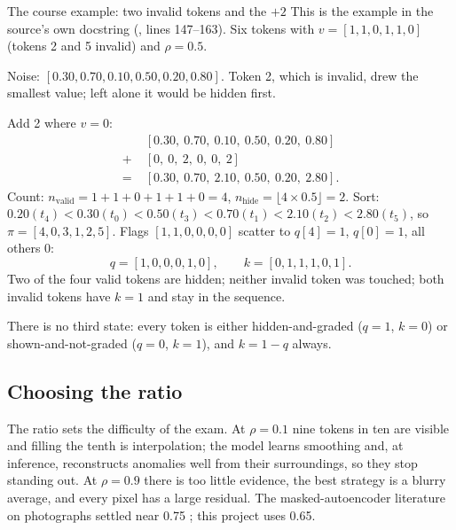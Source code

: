 \begin{worked}[label={we:masking:plus2}]{The course example: two invalid tokens and the \texorpdfstring{$+2$}{+2}}
This is the example in the source's own docstring (, lines 147--163). Six tokens
with $v = [1, 1, 0, 1, 1, 0]$ (tokens 2 and 5 invalid) and $\rho = 0.5$.

Noise: $[0.30, 0.70, 0.10, 0.50, 0.20, 0.80]$. Token 2, which is invalid, drew the smallest value; left
alone it would be hidden first.

Add 2 where $v = 0$:
\begin{align*}
&[0.30,\ 0.70,\ 0.10,\ 0.50,\ 0.20,\ 0.80]\\
+\;&[0,\ 0,\ 2,\ 0,\ 0,\ 2]\\
=\;&[0.30,\ 0.70,\ 2.10,\ 0.50,\ 0.20,\ 2.80] .
\end{align*}
Count: $n_{\text{valid}} = 1+1+0+1+1+0 = 4$, $n_{\text{hide}} = \lfloor 4 \times 0.5 \rfloor = 2$.
Sort: $0.20 (t_4) < 0.30 (t_0) < 0.50 (t_3) < 0.70 (t_1) < 2.10 (t_2) < 2.80 (t_5)$, so
$\pi = [4, 0, 3, 1, 2, 5]$. Flags $[1, 1, 0, 0, 0, 0]$ scatter to $q[4] = 1$, $q[0] = 1$, all others 0:
\[
q = [1, 0, 0, 0, 1, 0], \qquad k = [0, 1, 1, 1, 0, 1] .
\]
Two of the four valid tokens are hidden; neither invalid token was touched; both invalid tokens have
$k = 1$ and stay in the sequence.
\end{worked}


There is no third state: every token is either hidden-and-graded ($q = 1$, $k = 0$) or
shown-and-not-graded ($q = 0$, $k = 1$), and $k = 1 - q$ always.

\subsection{Choosing the ratio}

The ratio sets the difficulty of the exam. At $\rho = 0.1$ nine tokens in ten are visible and filling
the tenth is interpolation; the model learns smoothing and, at inference, reconstructs anomalies well
from their surroundings, so they stop standing out. At $\rho = 0.9$ there is too little evidence, the
best strategy is a blurry average, and every pixel has a large residual. The masked-autoencoder
literature on photographs settled near 0.75 \citep{he2022masked}; this project uses 0.65.

